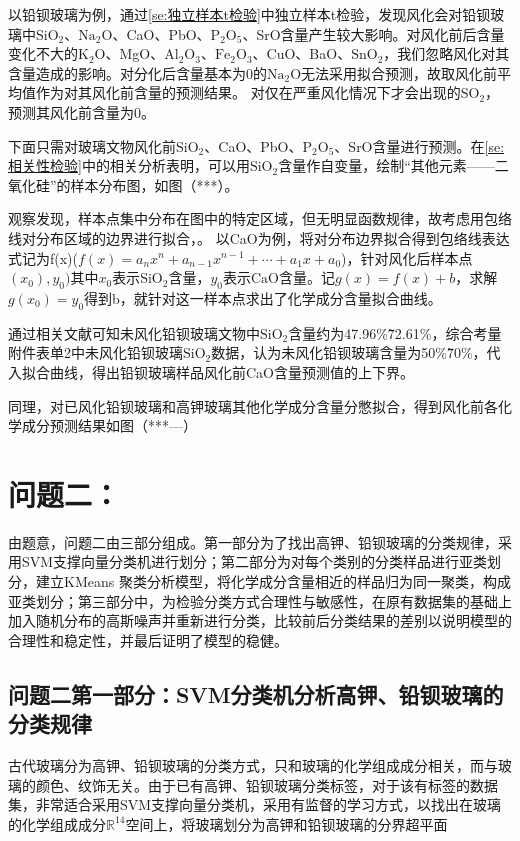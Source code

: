 \documentclass[withoutpreface,bwprint]{cumcmthesis}
\newcommand{\R}{\mathbb{R}}
\newcommand{\mr}[1]{\mathrm{#1}}
\begin{document}
以铅钡玻璃为例，通过\ref{se:独立样本t检验}中独立样本t检验，发现风化会对铅钡玻璃中$\mr{SiO_2}$、$\mr{Na_2O}$、CaO、PbO、$\mr{P_2O_5}$、SrO含量产生较大影响。对风化前后含量变化不大的$\mr{K_2O}$、MgO、$\mr{Al_2O_3}$、$\mr{Fe_2O_3}$、CuO、BaO、$\mr{SnO_2}$，我们忽略风化对其含量造成的影响。对分化后含量基本为0的$\mr{Na_2O}$无法采用拟合预测，故取风化前平均值作为对其风化前含量的预测结果。
对仅在严重风化情况下才会出现的$\mr{SO_2}$，预测其风化前含量为0。

下面只需对玻璃文物风化前$\mr{SiO_2}$、CaO、PbO、$\mr{P_2O_5}$、SrO含量进行预测。在\ref{se:相关性检验}中的相关分析表明，可以用$\mr{SiO_2}$含量作自变量，绘制“其他元素——二氧化硅”的样本分布图，如图（***）。

观察发现，样本点集中分布在图中的特定区域，但无明显函数规律，故考虑用包络线对分布区域的边界进行拟合，。
以CaO为例，将对分布边界拟合得到包络线表达式记为f(x)($f(x)=a_nx^n+a_{n-1}x^{n-1}+\cdots+a_1x+a_0$)，针对风化后样本点$(x_0),y_0)$其中$x_0$表示$\mr{SiO_2}$含量，$y_0$表示$\mr{CaO}$含量。记$g(x)=f(x)+b$，求解$g(x_0)=y_0$得到b，就针对这一样本点求出了化学成分含量拟合曲线。

通过相关文献可知未风化铅钡玻璃文物中$\mr{SiO_2}$含量约为47.96\%\~72.61\%，综合考量附件表单2中未风化铅钡玻璃$\mr{SiO_2}$数据，认为未风化铅钡玻璃含量为50\%\~70\%，代入拟合曲线，得出铅钡玻璃样品风化前CaO含量预测值的上下界。

同理，对已风化铅钡玻璃和高钾玻璃其他化学成分含量分憋拟合，得到风化前各化学成分预测结果如图（***—）

\section{问题二：}
由题意，问题二由三部分组成。第一部分为了找出高钾、铅钡玻璃的分类规律，采用SVM支撑向量分类机进行划分；第二部分为对每个类别的分类样品进行亚类划分，建立KMeans 聚类分析模型，将化学成分含量相近的样品归为同一聚类，构成亚类划分；第三部分中，为检验分类方式合理性与敏感性，在原有数据集的基础上加入随机分布的高斯噪声并重新进行分类，比较前后分类结果的差别以说明模型的合理性和稳定性，并最后证明了模型的稳健。
\subsection{问题二第一部分：SVM分类机分析高钾、铅钡玻璃的分类规律}
	古代玻璃分为高钾、铅钡玻璃的分类方式，只和玻璃的化学组成成分相关，而与玻璃的颜色、纹饰无关。由于已有高钾、铅钡玻璃分类标签，对于该有标签的数据集，非常适合采用SVM支撑向量分类机，采用有监督的学习方式，以找出在玻璃的化学组成成分$\R^{14}$空间上，将玻璃划分为高钾和铅钡玻璃的分界超平面
\end{document}
